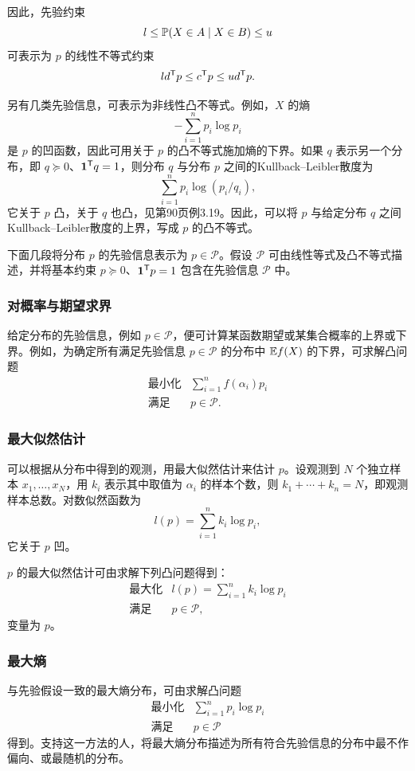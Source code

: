 因此，先验约束
\[
 l\le\mathbb P(X\in A\mid X\in B)\le u
\]
可表示为 $p$ 的线性不等式约束
\[
 l d^{\mathsf T}p\le c^{\mathsf T}p\le u d^{\mathsf T}p.
\]

另有几类先验信息，可表示为非线性凸不等式。例如，$X$ 的熵
\[
 -\sum_{i=1}^np_i\log p_i
\]
是 $p$ 的凹函数，因此可用关于 $p$ 的凸不等式施加熵的下界。如果 $q$ 表示另一个分布，即 $q\succeq0$、$\mathbf 1^{\mathsf T}q=1$，则分布 $q$ 与分布 $p$ 之间的Kullback--Leibler散度为
\[
 \sum_{i=1}^np_i\log(p_i/q_i),
\]
它关于 $p$ 凸，关于 $q$ 也凸，见第90页例3.19。因此，可以将 $p$ 与给定分布 $q$ 之间Kullback--Leibler散度的上界，写成 $p$ 的凸不等式。

下面几段将分布 $p$ 的先验信息表示为 $p\in\mathcal P$。假设 $\mathcal P$ 可由线性等式及凸不等式描述，并将基本约束 $p\succeq0$、$\mathbf 1^{\mathsf T}p=1$ 包含在先验信息 $\mathcal P$ 中。

\subsubsection*{对概率与期望求界}
给定分布的先验信息，例如 $p\in\mathcal P$，便可计算某函数期望或某集合概率的上界或下界。例如，为确定所有满足先验信息 $p\in\mathcal P$ 的分布中 $\mathbb E f(X)$ 的下界，可求解凸问题
\[
\begin{array}{ll}
\text{最小化}&\sum_{i=1}^nf(\alpha_i)p_i\\
\text{满足}&p\in\mathcal P.
\end{array}
\]

\subsubsection*{最大似然估计}
可以根据从分布中得到的观测，用最大似然估计来估计 $p$。设观测到 $N$ 个独立样本 $x_1,\ldots,x_N$，用 $k_i$ 表示其中取值为 $\alpha_i$ 的样本个数，则 $k_1+\cdots+k_n=N$，即观测样本总数。对数似然函数为
\[
 l(p)=\sum_{i=1}^nk_i\log p_i,
\]
它关于 $p$ 凹。

$p$ 的最大似然估计可由求解下列凸问题得到：
\[
\begin{array}{ll}
\text{最大化}&l(p)=\sum_{i=1}^nk_i\log p_i\\
\text{满足}&p\in\mathcal P,
\end{array}
\]
变量为 $p$。

\subsubsection*{最大熵}
与先验假设一致的最大熵分布，可由求解凸问题
\[
\begin{array}{ll}
\text{最小化}&\sum_{i=1}^np_i\log p_i\\
\text{满足}&p\in\mathcal P
\end{array}
\]
得到。支持这一方法的人，将最大熵分布描述为所有符合先验信息的分布中最不作偏向、或最随机的分布。


